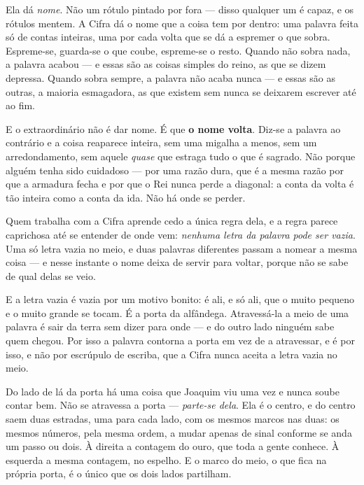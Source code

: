 \documentclass[livro.tex]{subfiles}
\begin{document}
Ela dá \emph{nome}. Não um rótulo pintado por fora --- disso qualquer um é capaz, e os rótulos
mentem. A Cifra dá o nome que a coisa tem por dentro: uma palavra feita só de contas inteiras, uma
por cada volta que se dá a espremer o que sobra. Espreme-se, guarda-se o que coube, espreme-se o
resto. Quando não sobra nada, a palavra acabou --- e essas são as coisas simples do reino, as que
se dizem depressa. Quando sobra sempre, a palavra não acaba nunca --- e essas são as outras, a
maioria esmagadora, as que existem sem nunca se deixarem escrever até ao fim.

E o extraordinário não é dar nome. É que \textbf{o nome volta}. Diz-se a palavra ao contrário e a
coisa reaparece inteira, sem uma migalha a menos, sem um arredondamento, sem aquele
\emph{quase} que estraga tudo o que é sagrado. Não porque alguém tenha sido cuidadoso --- por uma
razão dura, que é a mesma razão por que a armadura fecha e por que o Rei nunca perde a diagonal:
a conta da volta é tão inteira como a conta da ida. Não há onde se perder.

\medskip

Quem trabalha com a Cifra aprende cedo a única regra dela, e a regra parece caprichosa até se
entender de onde vem: \emph{nenhuma letra da palavra pode ser vazia}. Uma só letra vazia no meio,
e duas palavras diferentes passam a nomear a mesma coisa --- e nesse instante o nome deixa de
servir para voltar, porque não se sabe de qual delas se veio.

E a letra vazia é vazia por um motivo bonito: é ali, e só ali, que o muito pequeno e o muito grande
se tocam. É a porta da alfândega. Atravessá-la a meio de uma palavra é sair da terra sem dizer
para onde --- e do outro lado ninguém sabe quem chegou. Por isso a palavra contorna a porta em
vez de a atravessar, e é por isso, e não por escrúpulo de escriba, que a Cifra nunca aceita a
letra vazia no meio.

\medskip

Do lado de lá da porta há uma coisa que Joaquim viu uma vez e nunca soube contar bem. Não se
atravessa a porta --- \emph{parte-se dela}. Ela é o centro, e do centro saem duas estradas, uma
para cada lado, com os mesmos marcos nas duas: os mesmos números, pela mesma ordem, a mudar
apenas de sinal conforme se anda um passo ou dois. À direita a contagem do ouro, que toda a gente
conhece. À esquerda a mesma contagem, no espelho. E o marco do meio, o que fica na própria porta,
é o único que os dois lados partilham.

\medskip
\end{document}
